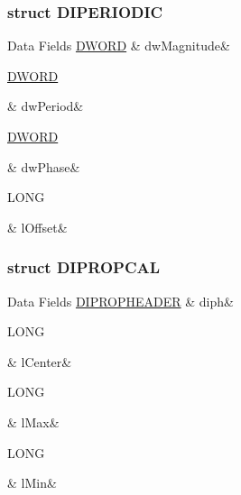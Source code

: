 \subsubsection{struct D\-I\-P\-E\-R\-I\-O\-D\-I\-C}
\begin{DoxyFields}{Data Fields}
\hypertarget{a00003_aa700b7f2ede11bee54ae3bdf5e3d750c}{\hyperlink{a00003_a50e15ae51c87ae06ab29c8148cb5f36c}{D\-W\-O\-R\-D}}\label{a00003_aa700b7f2ede11bee54ae3bdf5e3d750c}
&
dw\-Magnitude&
\\
\hline

\hypertarget{a00003_aa2f5a91048b2b932c948361f50b48bb3}{\hyperlink{a00003_a50e15ae51c87ae06ab29c8148cb5f36c}{D\-W\-O\-R\-D}}\label{a00003_aa2f5a91048b2b932c948361f50b48bb3}
&
dw\-Period&
\\
\hline

\hypertarget{a00003_ab12774a60138804b596b9e7eb69393fb}{\hyperlink{a00003_a50e15ae51c87ae06ab29c8148cb5f36c}{D\-W\-O\-R\-D}}\label{a00003_ab12774a60138804b596b9e7eb69393fb}
&
dw\-Phase&
\\
\hline

\hypertarget{a00003_a2e20f7009060c677fbc0331de06a4c1c}{L\-O\-N\-G}\label{a00003_a2e20f7009060c677fbc0331de06a4c1c}
&
l\-Offset&
\\
\hline

\end{DoxyFields}
\label{d9/d77/a00095}
\hypertarget{a00003_d9/d77/a00095}{}
\subsubsection{struct D\-I\-P\-R\-O\-P\-C\-A\-L}
\begin{DoxyFields}{Data Fields}
\hypertarget{a00003_a7010842dfbdaa5bb4357503558202537}{\hyperlink{a00003_d0/d61/a00100}{D\-I\-P\-R\-O\-P\-H\-E\-A\-D\-E\-R}}\label{a00003_a7010842dfbdaa5bb4357503558202537}
&
diph&
\\
\hline

\hypertarget{a00003_a271b2b5d08539a4cd14a9bd4ee5131b4}{L\-O\-N\-G}\label{a00003_a271b2b5d08539a4cd14a9bd4ee5131b4}
&
l\-Center&
\\
\hline

\hypertarget{a00003_a373c13e8e98fe384db9be83136ac5c04}{L\-O\-N\-G}\label{a00003_a373c13e8e98fe384db9be83136ac5c04}
&
l\-Max&
\\
\hline

\hypertarget{a00003_a10b99c2e16e80d932b8c67ff9239ecb9}{L\-O\-N\-G}\label{a00003_a10b99c2e16e80d932b8c67ff9239ecb9}
&
l\-Min&
\\
\hline

\end{DoxyFields}
\label{d9/df8/a00096}
\hypertarget{a00003_d9/df8/a00096}{}
